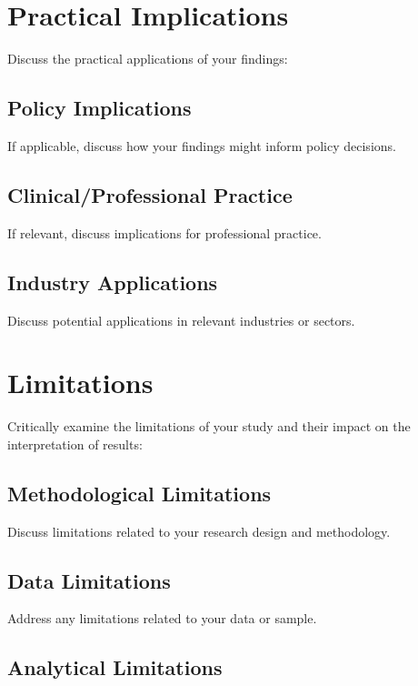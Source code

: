 \section{Practical Implications}

Discuss the practical applications of your findings:

\subsection{Policy Implications}

If applicable, discuss how your findings might inform policy decisions.

\subsection{Clinical/Professional Practice}

If relevant, discuss implications for professional practice.

\subsection{Industry Applications}

Discuss potential applications in relevant industries or sectors.

\section{Limitations}

Critically examine the limitations of your study and their impact on the interpretation of results:

\subsection{Methodological Limitations}

Discuss limitations related to your research design and methodology.

\subsection{Data Limitations}

Address any limitations related to your data or sample.

\subsection{Analytical Limitations}

